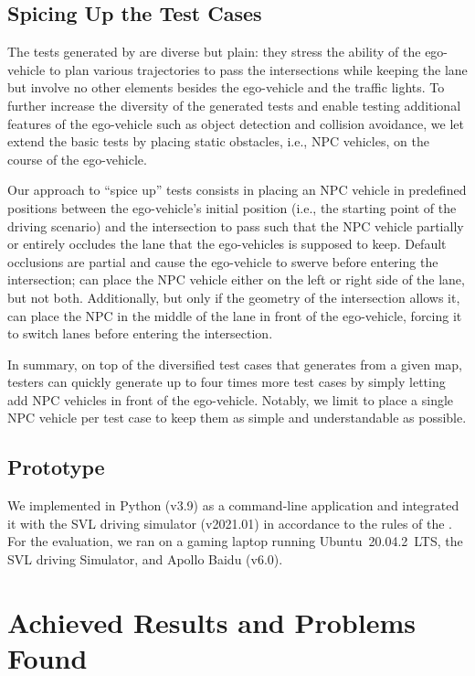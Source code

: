 \documentclass[conference]{IEEEtran}
\begin{document}
\subsection{Spicing Up the Test Cases}
\label{sec:spicing-up}
The tests generated by \tool are diverse but plain: they stress the ability of the ego-vehicle to plan various trajectories to pass the intersections while keeping the lane but involve no other elements besides the ego-vehicle and the traffic lights. To further increase the diversity of the generated tests and enable testing additional features of the ego-vehicle such as object detection and collision avoidance, we let \tool extend the basic tests by placing static obstacles, i.e., NPC vehicles, on the course of the ego-vehicle.

Our approach to ``spice up'' tests consists in placing an NPC vehicle in predefined positions between the ego-vehicle's initial position (i.e., the starting point of the driving scenario) and the intersection to pass such that the NPC vehicle partially or entirely occludes the lane that the ego-vehicles is supposed to keep. Default occlusions are partial and cause the ego-vehicle to swerve before entering the intersection; \tool can place the NPC vehicle either on the left or right side of the lane, but not both. Additionally, but only if the geometry of the intersection allows it, \tool can place the NPC in the middle of the lane in front of the ego-vehicle, forcing it to switch lanes before entering the intersection.

In summary, on top of the diversified test cases that \tool generates from a given map, testers can quickly generate up to four times more test cases by simply letting \tool add NPC vehicles in front of the ego-vehicle. Notably, we limit \tool to place a single NPC vehicle per test case to keep them as simple and understandable as possible.

\subsection{Prototype}
We implemented \tool in Python (v3.9) as a command-line application and integrated it with the SVL driving simulator (v2021.01) in accordance to the rules of the \challenge.
For the evaluation, we ran \tool on a gaming laptop running Ubuntu~20.04.2~LTS, the SVL driving Simulator, and Apollo Baidu (v6.0).

\section{Achieved Results and Problems Found}
\label{sec:evaluation}
\end{document}
